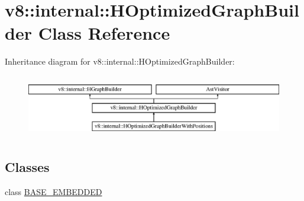 \hypertarget{classv8_1_1internal_1_1_h_optimized_graph_builder}{}\section{v8\+:\+:internal\+:\+:H\+Optimized\+Graph\+Builder Class Reference}
\label{classv8_1_1internal_1_1_h_optimized_graph_builder}
Inheritance diagram for v8\+:\+:internal\+:\+:H\+Optimized\+Graph\+Builder\+:\begin{figure}[H]
\begin{center}
\leavevmode
\includegraphics[height=2.790698cm]{classv8_1_1internal_1_1_h_optimized_graph_builder}
\end{center}
\end{figure}
\subsection*{Classes}
\begin{DoxyCompactItemize}
\item 
class \hyperlink{classv8_1_1internal_1_1_h_optimized_graph_builder_1_1_b_a_s_e___e_m_b_e_d_d_e_d}{B\+A\+S\+E\+\_\+\+E\+M\+B\+E\+D\+D\+E\+D}
\end{DoxyCompactItemize}

